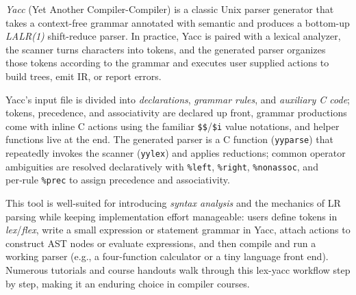 \textit{Yacc} (Yet Another Compiler-Compiler) is a classic Unix parser generator that takes a context-free grammar annotated with
semantic and produces a bottom-up \emph{LALR(1)} shift-reduce parser. In practice, Yacc is paired with a lexical analyzer, 
the scanner turns characters into tokens, and the generated parser organizes those tokens according to the grammar and executes 
user supplied actions to build trees, emit IR, or report errors. 

Yacc's input file is divided into \emph{declarations}, \emph{grammar rules}, and \emph{auxiliary C code}; tokens, precedence, 
and associativity are declared up front, grammar productions come with inline C actions using the familiar \verb|$$|/\verb|$i| 
value notations, and helper functions live at the end. The generated parser is a C function (\texttt{yyparse}) that repeatedly 
invokes the scanner (\texttt{yylex}) and applies reductions; common operator ambiguities are resolved declaratively 
with \verb|%left|, \verb|%right|, \verb|%nonassoc|, and per‑rule \verb|%prec| to assign precedence and associativity. 

This tool is well-suited for introducing \emph{syntax analysis} and the mechanics of LR parsing while keeping implementation 
effort manageable: users define tokens in \textit{lex}/\textit{flex}, write a small expression or statement grammar in Yacc, 
attach actions to construct AST nodes or evaluate expressions, and then compile and run a working parser 
(e.g., a four-function calculator or a tiny language front end). 
Numerous tutorials and course handouts walk through this lex-yacc workflow step by step, making it an enduring choice in compiler courses. 


 